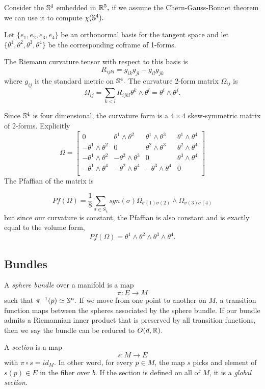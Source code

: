 \begin{example}
Consider the $\mathbb{S}^4$ embedded in $\mathbb{R}^5,$ if we assume the Chern-Gauss-Bonnet
theorem we can use it to compute $\chi(\mathbb{S}^4).$

Let $\{e_1,e_2,e_3,e_4\}$ be an orthonormal basis for the tangent space
and let $\{\theta^1,\theta^2,\theta^3,\theta^4\}$ be the corresponding coframe
of 1-forms.

The Riemann curvature tensor with respect to this basis is
$$R_{ijkl}=g_{ik}g_{jl}-g_{il}g_{jk}$$
where $g_{ij}$ is the standard metric on $\mathbb{S}^4.$
The curvature 2-form matrix $\Omega_{ij}$ is
$$\Omega_{ij}=\sum_{k<l}R_{ijkl}\theta^k \land \theta^l=\theta^i\land \theta^j.$$

Since $\mathbb{S}^4$ is four dimensional, the curvature form is a $4\times 4$ skew-symmetric
matrix of 2-forms. 
Explicitly
$$\Omega = \begin{bmatrix}
0 & \theta^1\land \theta^2 & \theta^1\land \theta^3 & \theta^1\land \theta^4\\
- \theta^1\land \theta^2 & 0 & \theta^2\land \theta^3 & \theta^2\land \theta^4\\
- \theta^1\land \theta^2 & - \theta^2\land \theta^3 & 0 & \theta^3\land \theta^4\\
- \theta^1\land \theta^4 & - \theta^2\land \theta^4 & - \theta^3\land \theta^4 & 0\\
\end{bmatrix}$$
The Pfaffian of the matrix is


$$Pf(\Omega)=\frac{1}{8}\sum_{\sigma\in S_4}sgn(\sigma)\Omega_{\sigma(1)\sigma(2)}\land \Omega_{\sigma(3)\sigma(4)}$$
but since our curvature is constant, the Pfaffian is also constant and is exactly
equal to the volume form,
$$Pf(\Omega)= \theta^1\land \theta^2\land \theta^3\land \theta^4.$$


\end{example}

\subsection{Bundles}
A \emph{sphere bundle} over a manifold is a map
$$\pi:E\rightarrow M$$
such that $\pi^{-1}(p)\simeq \mathbb{S}^n.$ 
If we move from one point to another on $M$, a transition function
maps between the spheres associated by the sphere bundle.
If our bundle admits a Riemannian inner product that is preserved
by all transition functions, then we say the bundle can be reduced to $O(d,\mathbb{R}).$

A \emph{section}
is a map
$$s:M\rightarrow E$$
with $\pi \circ s = id_M.$ In other word, for every $p\in M$,
the map $s$ picks and element of $s(p)\in E$ in the fiber over $b$.
If the section is defined on all of $M$, it is a \emph{global section}.

